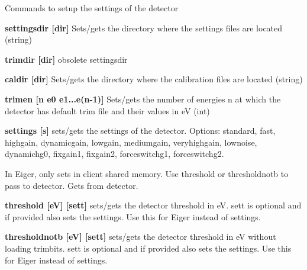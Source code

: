 Commands to setup the settings of the detector


\begin{DoxyItemize}
\item {\bfseries settingsdir \mbox{[}dir\mbox{]}} Sets/gets the directory where the settings files are located (string)
\end{DoxyItemize}


\begin{DoxyItemize}
\item {\bfseries trimdir \mbox{[}dir\mbox{]}} obsolete {\ttfamily settingsdir} 
\end{DoxyItemize}


\begin{DoxyItemize}
\item {\bfseries caldir \mbox{[}dir\mbox{]}} Sets/gets the directory where the calibration files are located (string)
\end{DoxyItemize}


\begin{DoxyItemize}
\item {\bfseries trimen \mbox{[}n e0 e1...e(n-\/1)\mbox{]}} Sets/gets the number of energies n at which the detector has default trim file and their values in eV (int)
\end{DoxyItemize}


\begin{DoxyItemize}
\item {\bfseries settings \mbox{[}s\mbox{]}} sets/gets the settings of the detector. Options: {\ttfamily standard}, {\ttfamily fast}, {\ttfamily highgain}, {\ttfamily dynamicgain}, {\ttfamily lowgain}, {\ttfamily mediumgain}, {\ttfamily veryhighgain}, {\ttfamily lownoise}, {\ttfamily dynamichg0}, {\ttfamily fixgain1}, {\ttfamily fixgain2}, {\ttfamily forceswitchg1}, {\ttfamily forceswitchg2}. \par
 In Eiger, only sets in client shared memory. Use {\ttfamily threshold} or {\ttfamily thresholdnotb} to pass to detector. Gets from detector.
\end{DoxyItemize}


\begin{DoxyItemize}
\item {\bfseries threshold \mbox{[}eV\mbox{]} \mbox{[}sett\mbox{]} } sets/gets the detector threshold in eV. sett is optional and if provided also sets the settings. Use this for Eiger instead of {\ttfamily settings}.
\end{DoxyItemize}


\begin{DoxyItemize}
\item {\bfseries thresholdnotb \mbox{[}eV\mbox{]} \mbox{[}sett\mbox{]} } sets/gets the detector threshold in eV without loading trimbits. sett is optional and if provided also sets the settings. Use this for Eiger instead of {\ttfamily settings}.
\end{DoxyItemize}


